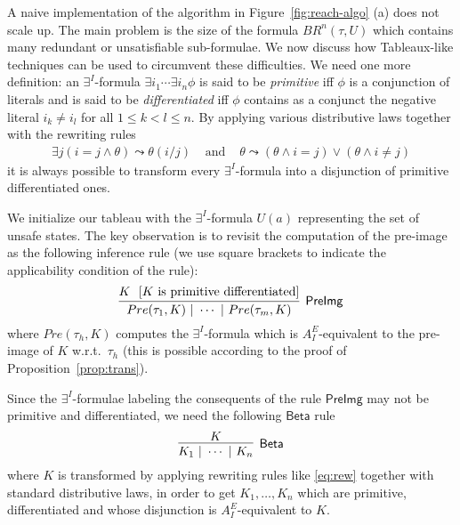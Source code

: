 \documentclass{LMCS}
\theoremstyle{plain}\newtheorem{assumption}[thm]{Assumption}
\theoremstyle{plain}\newtheorem{proposition}[thm]{Proposition}
\theoremstyle{plain}\newtheorem{property}[thm]{Property}
\theoremstyle{plain}\newtheorem{example}[thm]{Example}
\theoremstyle{plain}\newtheorem{claim}[thm]{Claim}
\theoremstyle{plain}\newtheorem{lemma}[thm]{Lemma}
\begin{document}
A naive implementation of the algorithm in Figure~\ref{fig:reach-algo}
(a) does not scale up.  The main problem is the size of the formula
$BR^n(\tau,U)$ which contains many redundant or unsatisfiable
sub-formulae.  We now discuss how Tableaux-like techniques can be used
to circumvent these difficulties.  We need one more definition: an
$\exists^I$-formula $\exists i_1\cdots \exists i_n \phi$ is said to be
\emph{primitive} iff $\phi$ is a conjunction of literals and is said
to be \emph{differentiated} iff $\phi$ contains as a conjunct the
negative literal $i_k\not= i_l$ for all $1\leq k<l\leq n$. By applying
various distributive laws together with the rewriting rules
\begin{eqnarray}
  \label{eq:rew}
  \exists j (i=j\wedge \theta) \leadsto \theta(i/j)
  & \mbox{ and } &
  \theta \leadsto (\theta \wedge i=j)\vee (\theta \wedge i\not= j)
\end{eqnarray}
it is always possible to transform every $\exists^I$-formula into a
disjunction of primitive differentiated ones.

We initialize our tableau with the $\exists^I$-formula $U(a)$
representing the set of unsafe states.  The key observation is to
revisit the computation of the pre-image as the following inference
rule (we use square brackets to indicate the applicability  condition of the rule):
\begin{displaymath}
  \infer[\mathsf{PreImg}]
   {Pre(\tau_1, K) ~|~ \cdots ~|~ Pre(\tau_m, K)}
   {K~~[\mbox{$K$ is primitive differentiated}]}
\end{displaymath}
where $Pre(\tau_h, K)$ computes the $\exists^I$-formula which is
$A^E_I$-equivalent to the pre-image of $K$ w.r.t.\ $\tau_h$ (this is
possible according to the proof of Proposition~\ref{prop:trans}).

Since the $\exists^I$-formulae labeling the consequents of the rule
$\mathsf{PreImg}$ may not be primitive and differentiated, we need the
following $\mathsf{Beta}$ rule
\begin{displaymath}
  \infer[\mathsf{Beta}]
  { K_1 ~|~ \cdots ~|~ K_n}
   {K}
\end{displaymath}
where $K$ is  transformed  by applying rewriting rules like
\eqref{eq:rew} together with standard distributive laws, in order to
get $K_1, \dots, K_n$ which are primitive, differentiated and whose
disjunction is $A^E_I$-equivalent to $K$.
\end{document}
